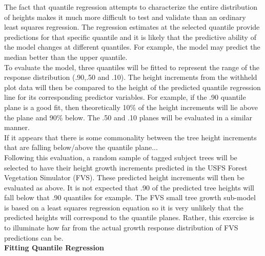 \documentclass[10pt, letterpaper, fleqn]{article}
\begin{document}
The fact that quantile regression attempts to characterize the entire distribution of heights makes it much more difficult to test and validate than an ordinary least squares regression.  The regression estimates at the selected quantile provide predictions for that specific quantile and it is likely that the predictive ability of the model changes at different quantiles.  For example, the model may predict the median better than the upper quantile. \\[2pt]

To evaluate the model, three quantiles will be fitted to represent the range of the response distribution (.90,.50 and .10).  The height increments from the withheld plot data will then be compared to the height of the predicted quantile regression line for its corresponding predictor variables.  For example, if the .90 quantile plane is a good fit, then theoretically 10\% of the height increments will lie above the plane and 90\% below.  The .50 and .10 planes will be evaluated in a similar manner. \\[2pt]

	If it appears that there is some commonality between the tree height increments that are falling below/above the quantile plane...\\[2pt]

Following this evaluation, a random sample of tagged subject trees will be selected to have their height growth increments predicted in the USFS Forest Vegetation Simulator (FVS).  These predicted height increments will then be evaluated as above.  It is not expected that .90 of the predicted tree heights will fall below that .90 quantiles for example. The FVS small tree growth sub-model is based on a least squares regression equation so it is very unlikely that the predicted heights will correspond to the quantile planes.   Rather, this exercise is to illuminate how far from the actual growth response distribution of FVS predictions can be.\\[2pt]

\textbf{Fitting Quantile Regression}\\[1pt]
\end{document}
